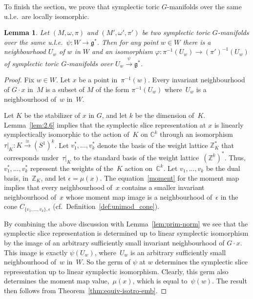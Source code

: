 \documentclass[10pt,a4paper]{amsart}
\numberwithin{equation}{section}
\newtheorem{Lemma}{Lemma}[section]
\begin{document}
To f\/inish the section, we prove that symplectic toric $G$-manifolds
over the same u.l.e.\ are locally isomorphic.

\begin{Lemma} \label{lem:loc-iso}
Let $(M, \omega, \pi)$
and $(M', \omega',  \pi')$
be two symplectic toric $G$-manifolds
over the same u.l.e.\ $\psi \colon W\to {\mathfrak g}^*$.
Then for any point $w \in W$
there is a neighbourhood $U_w$ of $w$ in $W$ and an isomorphism
$\varphi \colon \pi^{-1} (U_w) \to (\pi')^{-1} (U_w)$ of symplectic
toric $G$-manifolds over $U_w \stackrel{\psi}{\to}{\mathfrak g}^* $.
\end{Lemma}

\begin{proof}
Fix $w \in W$.
Let $x$ be a point in~$\pi^{-1}(w)$.
Every invariant neighbourhood of $G \cdot x$ in~$M$
is a subset of $M$ of the form $\pi^{-1}(U_w)$
where~$U_w$ is a neighbourhood of~$w$ in~$W$.

Let $K$ be the stabilizer of $x$ in $G$, and let $k$ be the dimension
of~$K$.  Lemma~\ref{lem:2.6} implies that the symplectic slice
representation at $x$ is linearly symplectically isomorphic to the
action of~$K$ on ${\mathbb C}^k$ through an isomorphism $\tau|_K \colon K
\stackrel{\cong}{\to} (S^1)^k$.  Let $v_1^*,\ldots,v_k^*$ denote the
basis of the weight lattice ${\mathbb Z}_K^*$ that corresponds under~$\tau|_K$
to the standard basis of the weight lattice~$({\mathbb Z}^k)^*$.  Thus,
$v_1^*,\ldots,v_k^*$ represent the weights of the~$K$ action on~${\mathbb C}^k$.  Let $v_1,\ldots,v_k$ be the dual basis, in~${\mathbb Z}_K$, and let
$\epsilon = \mu(x)$.  The equation~\eqref{moment} for the moment map
implies that every neighbourhood of~$x$ contains a smaller invariant
neighbourhood of~$x$ whose moment map image is a neighbourhood of~$\epsilon$ in the cone $C_{\{v_1,\ldots,v_k\},\epsilon}$ (cf.\
Def\/inition~\ref{def:unimod_cone}).

By combining the above discussion with  Lemma~\ref{lem:prim-norm} we see that
the symplectic slice representation is determined up to linear
symplectic isomorphism by the image of
an arbitrary suf\/f\/iciently small invariant neighbourhood of $G \cdot x$.
This image is exactly $\psi(U_w)$, where~$U_w$ is an arbitrary
suf\/f\/iciently small
neighbourhood of~$w$ in~$W$.  So the germ of $\psi$ at $w$ determines
the symplectic slice representation up to linear symplectic
isomorphism.  Clearly, this germ also determines the moment map value,~$\mu(x)$, which is equal to~$\psi(w)$.  The result then follows from
Theorem~\ref{thm:equiv-isotro-emb}.
\end{proof}
\end{document}
